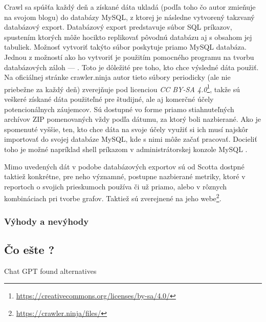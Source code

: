 Crawl sa spúšťa každý deň a získané dáta ukladá (podľa toho čo autor zmieňuje na svojom blogu) do databázy MySQL, z ktorej je následne vytvorený takzvaný databázový export.
Databázový export predstavuje súbor SQL príkazov, spustením ktorých môže hocikto replikovať pôvodnú databázu aj s obsahom jej tabuliek. 
Možnosť vytvoriť takýto súbor poskytuje priamo MySQL databáza. 
Jednou z možností ako ho vytvoriť je použitím pomocného programu na tvorbu databázových záloh ---  \cite{mysql-doc}.
Toto je dôležité pre toho, kto chce výsledné dáta použiť. 
Na oficiálnej stránke crawler.ninja autor tieto súbory periodicky (ale nie priebežne za každý deň) zverejňuje pod licenciou \textit{CC BY-SA 4.0}\footnote{\href{https://creativecommons.org/licenses/by-sa/4.0/}{https://creativecommons.org/licenses/by-sa/4.0/}}, takže sú veškeré získané dáta použiteľné pre študijné, ale aj komerčné účely potencionálnych záujemcov.
Sú dostupné vo forme priamo stiahnuteľných archívov ZIP pomenovaných vždy podľa dátumu, za ktorý boli nazbierané.
Ako je spomenuté vyššie, ten, kto chce dáta na svoje účely využiť si ich musí najskôr importovať do svojej databáze MySQL, kde s nimi môže začať pracovať.
Docieliť toho je možné napríklad shell príkazom  v administrátorskej konzole MySQL \cite{mysql-doc}.

Mimo uvedených dát v podobe databázových exportov sú od Scotta dostpné taktiež konkrétne, pre neho významné, postupne nazbierané metriky, ktoré v reportoch o svojich prieskumoch používa či už priamo, alebo v rôznych kombináciach pri tvorbe grafov. Taktiež sú zverejnené na jeho webe\footnote{\href{https://crawler.ninja/files/}{https://crawler.ninja/files/}}.

\subsubsection{Výhody a nevýhody}


\subsection{Čo ešte ?}

Chat GPT found alternatives
